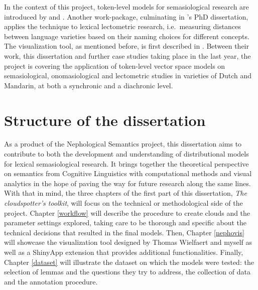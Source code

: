 \documentclass[
]{book}
\begin{document}
In the context of this project, token-level models for semasiological research are introduced by \textcite{heylen.etal_2012} and \textcite{heylen.etal_2015}. Another work-package, culminating in \textcite{depascale_2019}'s PhD dissertation, applies the technique to lexical lectometric research, i.e.~measuring distances between language varieties based on their naming choices for different concepts. The visualization tool, as mentioned before, is first described in \textcite{wielfaert.etal_2019}. Between their work, this dissertation and further case studies taking place in the last year, the project is covering the application of token-level vector space models on semasiological, onomasiological and lectometric studies in varieties of Dutch and Mandarin, at both a synchronic and a diachronic level.

\hypertarget{str}{%
\section{Structure of the dissertation}\label{str}}

As a product of the Nephological Semantics project, this dissertation aims to contribute to both the development and understanding of distributional models for lexical semasiological research.
It brings together the theoretical perspective on semantics from Cognitive Linguistics with computational methods and visual analytics in the hope of paving the way for future research along the same lines.
With that in mind, the three chapters of the first part of this dissertation, \emph{The cloudspotter's toolkit}, will focus on the technical or methodological side of the project.
Chapter \ref{workflow} will describe the procedure to create clouds and the parameter settings explored, taking care to be thorough and specific about the technical decisions that resulted in the final models.
Then, Chapter \ref{nephovis} will showcase the visualization tool designed by Thomas Wielfaert and myself as well as a ShinyApp extension that provides additional functionalities.
Finally, Chapter \ref{dataset} will illustrate the dataset on which the models were tested: the selection of lemmas and the questions they try to address, the collection of data and the annotation procedure.
\end{document}
